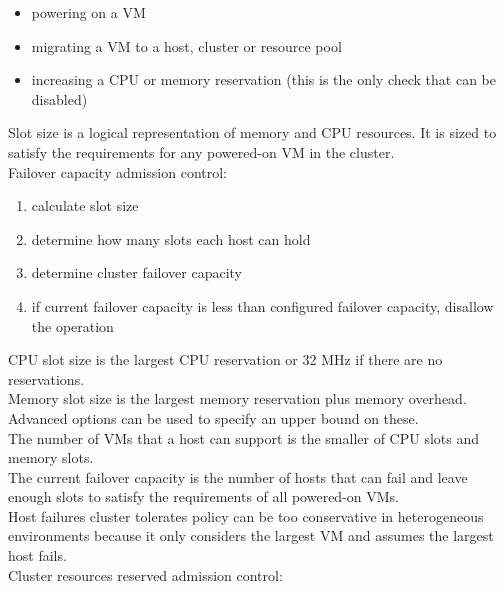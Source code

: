 \begin{itemize}
\item powering on a VM
\item migrating a VM to a host, cluster or resource pool
\item increasing a CPU or memory reservation (this is the only check that can
be disabled)
\end{itemize}

Slot size is a logical representation of memory and CPU resources. It is sized
to satisfy the requirements for any powered-on VM in the cluster.\\

Failover capacity admission control:

\begin{enumerate}
\item calculate slot size
\item determine how many slots each host can hold
\item determine cluster failover capacity
\item if current failover capacity is less than configured failover capacity,
disallow the operation
\end{enumerate}

CPU slot size is the largest CPU reservation or 32 MHz if there are no
reservations.\\

Memory slot size is the largest memory reservation plus memory overhead.\\

Advanced options can be used to specify an upper bound on these.\\

The number of VMs that a host can support is the smaller of CPU slots and
memory slots.\\

The current failover capacity is the number of hosts that can
fail and leave enough slots to satisfy the requirements of all powered-on
VMs.\\

Host failures cluster tolerates policy can be too conservative in
heterogeneous environments because it only considers the largest VM and assumes
the largest host fails.\\

Cluster resources reserved admission control:

